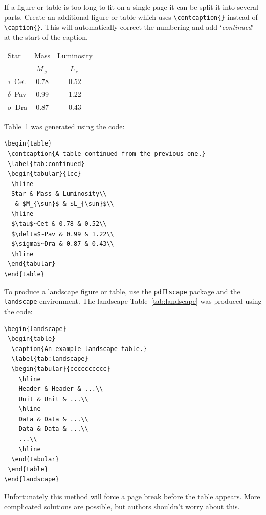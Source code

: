 \documentclass[fleqn,usenatbib,useAMS]{mnras}
\begin{document}
If a figure or table is too long to fit on a single page it can be split it into several parts.
Create an additional figure or table which uses \verb'\contcaption{}' instead of \verb'\caption{}'.
This will automatically correct the numbering and add `\emph{continued}' at the start of the caption.
\begin{table}
 \label{tab:continued}
 \begin{tabular}{lcc}
  \hline
  Star & Mass & Luminosity\\
   & $M_{\sun}$ & $L_{\sun}$\\
  \hline
  $\tau$~Cet & 0.78 & 0.52\\
  $\delta$~Pav & 0.99 & 1.22\\
  $\sigma$~Dra & 0.87 & 0.43\\
  \hline
 \end{tabular}
\end{table}
Table~\ref{tab:continued} was generated using the code:

\begin{verbatim}
\begin{table}
 \contcaption{A table continued from the previous one.}
 \label{tab:continued}
 \begin{tabular}{lcc}
  \hline
  Star & Mass & Luminosity\\
   & $M_{\sun}$ & $L_{\sun}$\\
  \hline
  $\tau$~Cet & 0.78 & 0.52\\
  $\delta$~Pav & 0.99 & 1.22\\
  $\sigma$~Dra & 0.87 & 0.43\\
  \hline
 \end{tabular}
\end{table}
\end{verbatim}

To produce a landscape figure or table, use the \verb'pdflscape' package and the \verb'landscape' environment.
The landscape Table~\ref{tab:landscape} was produced using the code:
\begin{verbatim}
\begin{landscape}
 \begin{table}
  \caption{An example landscape table.}
  \label{tab:landscape}
  \begin{tabular}{cccccccccc}
    \hline
    Header & Header & ...\\
    Unit & Unit & ...\\
    \hline
    Data & Data & ...\\
    Data & Data & ...\\
    ...\\
    \hline
  \end{tabular}
 \end{table}
\end{landscape}
\end{verbatim}
Unfortunately this method will force a page break before the table appears.
More complicated solutions are possible, but authors shouldn't worry about this.
\end{document}
